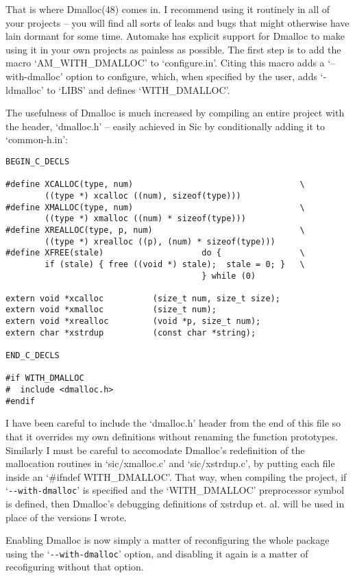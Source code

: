 That is where Dmalloc(48) comes in. I recommend using it routinely in all of your projects -- you will find all sorts of leaks and bugs that might otherwise have lain dormant for some time. Automake has explicit support for Dmalloc to make using it in your own projects as painless as possible. The first step is to add the macro `AM\_{}WITH\_{}DMALLOC' to `configure.in'. Citing this macro adds a `--with-dmalloc' option to configure, which, when specified by the user, adds `-ldmalloc' to `LIBS' and defines `WITH\_{}DMALLOC'.

The usefulness of Dmalloc is much increased by compiling an entire project with the header, `dmalloc.h' -- easily achieved in Sic by conditionally adding it to `common-h.in': 
 	
\begin{Verbatim}[frame=single]
BEGIN_C_DECLS

#define XCALLOC(type, num)                                  \
        ((type *) xcalloc ((num), sizeof(type)))
#define XMALLOC(type, num)                                  \
        ((type *) xmalloc ((num) * sizeof(type)))
#define XREALLOC(type, p, num)                              \
        ((type *) xrealloc ((p), (num) * sizeof(type)))
#define XFREE(stale)                    do {                \
        if (stale) { free ((void *) stale);  stale = 0; }   \
                                        } while (0)

extern void *xcalloc          (size_t num, size_t size);
extern void *xmalloc          (size_t num);
extern void *xrealloc         (void *p, size_t num);
extern char *xstrdup          (const char *string);

END_C_DECLS

#if WITH_DMALLOC
#  include <dmalloc.h>
#endif
\end{Verbatim}

I have been careful to include the `dmalloc.h' header from the end of this 
file so that it overrides my own definitions without renaming the function 
prototypes. Similarly I must be careful to accomodate Dmalloc's redefinition 
of the mallocation routines in `sic/xmalloc.c' and `sic/xstrdup.c', by 
putting each file inside an `\#ifndef WITH\_{}DMALLOC'. That way, when 
compiling the project, if `\verb+--with-dmalloc+' is specified and 
the `WITH\_{}DMALLOC' preprocessor symbol is defined, then Dmalloc's debugging definitions of xstrdup et. al. will be used in place of the versions I wrote.

Enabling Dmalloc is now simply a matter of reconfiguring the whole package 
using the `\verb+--with-dmalloc+' option, and disabling it again is a matter of recofiguring without that option.

